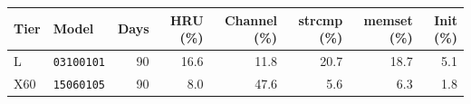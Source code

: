 \begin{tabular*}{\textwidth}{@{\extracolsep{\fill}}llrrrrrr@{}}
\toprule
Tier & Model & Days & HRU (\%) & Channel (\%) & strcmp (\%) & memset (\%) & Init (\%) \\
\midrule
L & \texttt{03100101} & 90 & 16.6 & 11.8 & 20.7 & 18.7 & 5.1 \\
X60 & \texttt{15060105} & 90 & 8.0 & 47.6 & 5.6 & 6.3 & 1.8 \\
\bottomrule
\end{tabular*}
